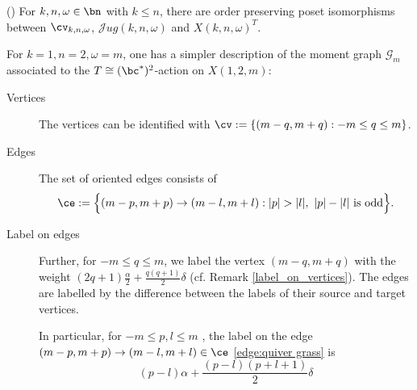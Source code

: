 \documentclass[10pt, a4paper, reqno]{amsart}
\begin{document}
\begin{guess}(\cite[Theorem 4.6]{flp24})
	For $k,n,\omega \in\bn$ with $k\leq n$, there are order preserving poset isomorphisms between $\cv_{k,n,\omega}$, $\mathscr{J}ug(k,n,\omega)$ and $X(k,n,\omega)^T$.
\end{guess}

For $k=1,n=2,\omega=m$, one has a simpler description of the moment graph  $\mathcal{G}_m$ associated to the $T\cong (\bc^*)^2$-action on $X(1,2,m)$:
\begin{description}
	\item[Vertices] The vertices can be identified with $\cv :=\{(m-q,m+q): -m\leq q\leq m\}$.
	\item[Edges] 
	The set of oriented edges consists of 
	\begin{equation}\label{edge:quiver grass}
		\ce:= \Big\{(m-p,m+p)\to (m-l,m+l) :|p|>|l|, ~|p|-|l| \text{ is odd}\Big\}.
		\end{equation}
	 
	 \item[Label on edges] Further, for $-m \leq q \leq m$, we label the vertex $(m - q, m + q)$ with the weight $(2q + 1)\frac{\alpha}{2}+ \frac{q(q + 1)}{2}\delta$  (cf. Remark \ref{label_on_vertices}). The edges are labelled by the difference between the labels of their source and target vertices. 
	 
	   In particular, for  $-m \leq p,l \leq m$ , the label on the edge $(m-p,m+p)\to (m-l,m+l)\in\ce$ \eqref{edge:quiver grass}  is 
	 \begin{equation}\label{label:edge}
	 	(p-l)\alpha+\frac{(p-l)(p+l+1)}{2}\delta
	 \end{equation}
\end{description}
\end{document}
